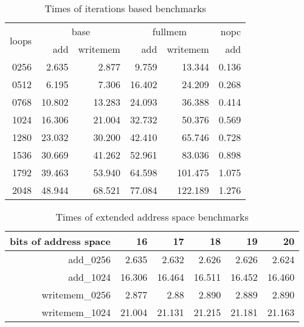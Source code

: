 \begin{table}
    \centering
    \begin{tabular}{r|rr|rr|r}
        \multirow{2}{*}{loops} & \multicolumn{2}{c|}{base} & \multicolumn{2}{c|}{fullmem} & nopc                      \\
                               & add                       & writemem                     & add    & writemem & add   \\ \hline
        0256                   & 2.635                     & 2.877                        & 9.759  & 13.344   & 0.136 \\
        0512                   & 6.195                     & 7.306                        & 16.402 & 24.209   & 0.268 \\
        0768                   & 10.802                    & 13.283                       & 24.093 & 36.388   & 0.414 \\
        1024                   & 16.306                    & 21.004                       & 32.732 & 50.376   & 0.569 \\
        1280                   & 23.032                    & 30.200                       & 42.410 & 65.746   & 0.728 \\
        1536                   & 30.669                    & 41.262                       & 52.961 & 83.036   & 0.898 \\
        1792                   & 39.463                    & 53.940                       & 64.598 & 101.475  & 1.075 \\
        2048                   & 48.944                    & 68.521                       & 77.084 & 122.189  & 1.276 \\
    \end{tabular}
    \caption{Times of iterations based benchmarks}\label{tab:time_iter}
\end{table}

\begin{table}
    \centering
    \begin{tabular}{r|rrrrr}
        bits of address space & 16     & 17     & 18     & 19     & 20     \\\hline
        add\_0256             & 2.635  & 2.632  & 2.626  & 2.626  & 2.624  \\
        add\_1024             & 16.306 & 16.464 & 16.511 & 16.452 & 16.460 \\

        writemem\_0256        & 2.877  & 2.88   & 2.890  & 2.889  & 2.890  \\
        writemem\_1024        & 21.004 & 21.131 & 21.215 & 21.181 & 21.163 \\

    \end{tabular}
    \caption{Times of extended address space benchmarks}\label{tab:time_extaddr}
\end{table}
